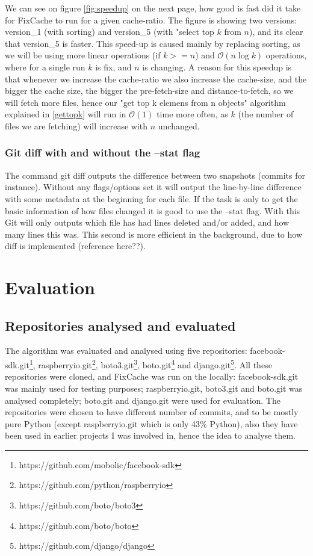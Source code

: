 \documentclass[12pt,twoside,notitlepage]{report}
\newcommand{\fxch}{FixCache}
\begin{document}
We can see on figure \ref{fig:speedup} on the next page, how good is fast did it take for \fxch{} to run for a given cache-ratio. The figure is showing two versions: version\_1 (with sorting) and version\_5 (with "select top $k$ from $n$), and its clear that version\_5 is faster.
This speed-up is caused mainly by replacing sorting, as we will be using more linear operations (if $k >= n$) and $\mathcal{O}(n\log{k})$ operations, where for a single run $k$ is fix, and $n$ is changing.
A reason for this speedup is that whenever we increase the cache-ratio we also increase the cache-size, and the bigger the cache size, the bigger the pre-fetch-size and distance-to-fetch, so we will fetch more files, hence our "get top k elemens from n objects" algorithm explained in \ref{gettopk} will run in $\mathcal{O}(1)$ time more often, as $k$ (the number of files we are fetching) will increase with $n$ unchanged.
\subsection{Git diff with and without the --stat flag}
The command git diff outputs the difference between two snapshots (commits for instance). Without any flags/options set it will output the line-by-line difference with some metadata at the beginning for each file. If the task is only to get the basic information of how files changed it is good to use the --stat flag. With this Git will only outputs which file has had lines deleted and/or added, and how many lines this was. This second is more efficient in the background, due to how diff is implemented (reference here??).
\chapter{Evaluation}
\section{Repositories analysed and evaluated}
The algorithm was evaluated and analysed using five repositories: facebook-sdk.git\footnote{https://github.com/mobolic/facebook-sdk}, raspberryio.git\footnote{https://github.com/python/raspberryio}, boto3.git\footnote{https://github.com/boto/boto3}, boto.git\footnote{https://github.com/boto/boto} and django.git\footnote{https://github.com/django/django}. All these repositories were cloned, and \fxch{} was run on the locally: facebook-sdk.git was mainly used for testing purposes; raspberryio.git, boto3.git and boto.git was analysed completely; boto.git and django.git were used for evaluation. The repositories were chosen to have different number of commits, and to be mostly pure Python (except raspberryio.git which is only 43\% Python), also they have been used in earlier projects I was involved in, hence the idea to analyse them.
\end{document}
